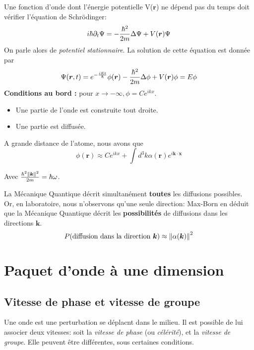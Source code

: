 \documentclass[../notesdecours]{subfiles}
\begin{document}
Une fonction d'onde dont l'énergie potentielle V($\bm{r}$) ne dépend pas du temps doit vérifier l'équation de Schrödinger:
\begin{equation}
i \hbar \partial_t \Psi = - \frac{\hbar^2}{2m} \Delta \Psi + V(\bm{r}) \Psi
\end{equation}
On parle alors de \textit{potentiel stationnaire}. La solution de cette équation est donnée par
\begin{equation}
\Psi (\bm{r},t) = e^{- \frac{iEt}{\hbar}} \phi(\bm{r}) - \frac{\hbar^2}{2m} \Delta \phi + V(\bm{r})\phi = E \phi
\end{equation}
\textbf{Conditions au bord : } pour $x\rightarrow -\infty, \phi = Ce^{ikx}$.
\begin{itemize}
\item Une partie de l'onde est construite tout droite.
\item Une partie est diffusée.
\end{itemize}
A grande distance de l'atome, nous avons que 
\begin{equation}
\phi(\bm{r}) \approx Ce^{ikx} + \int d^3k \alpha(\bm{r})e^{i \bm{k} \cdot \bm{x}}
\end{equation}
\begin{center}
Avec $\frac{\hbar^2\norm{\bm{k}}^2}{2m} = \hbar \omega$.
\end{center}
La Mécanique Quantique décrit simultanément \textbf{toutes} les diffusions possibles. Or, en laboratoire, nous n'observons qu'une seule direction: Max-Born en déduit que la Mécanique Quantique décrit les \textbf{possibilités} de diffusions dans les directions $\bm{k}$.
\begin{equation}
P(\text{diffusion dans la direction $\bm{k}$}) \approx \norm{\alpha(\bm{k})}^2
\end{equation}

\section{Paquet d'onde à une dimension}
\subsection{Vitesse de phase et vitesse de groupe}
Une onde est une perturbation se déplacnt dans le milieu. Il est possible de lui associer deux vitesses: soit la \emph{vitesse de phase} (ou \emph{célérité}), et la \emph{vitesse de groupe}. Elle peuvent être différentes, sous certaines conditions.\\
\end{document}
